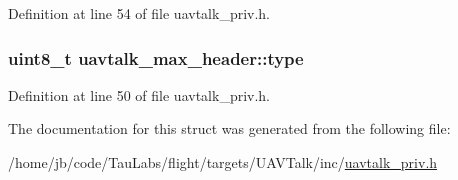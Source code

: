 \-Definition at line 54 of file uavtalk\-\_\-priv.\-h.

\hypertarget{structuavtalk__max__header_a5b36790b1ee1944fe8d335b817e5f424}{
\subsubsection[{type}]{\setlength{\rightskip}{0pt plus 5cm}uint8\-\_\-t {\bf uavtalk\-\_\-max\-\_\-header\-::type}}}\label{structuavtalk__max__header_a5b36790b1ee1944fe8d335b817e5f424}


\-Definition at line 50 of file uavtalk\-\_\-priv.\-h.



\-The documentation for this struct was generated from the following file\-:\begin{DoxyCompactItemize}
\item 
/home/jb/code/\-Tau\-Labs/flight/targets/\-U\-A\-V\-Talk/inc/\hyperlink{uavtalk__priv_8h}{uavtalk\-\_\-priv.\-h}\end{DoxyCompactItemize}

